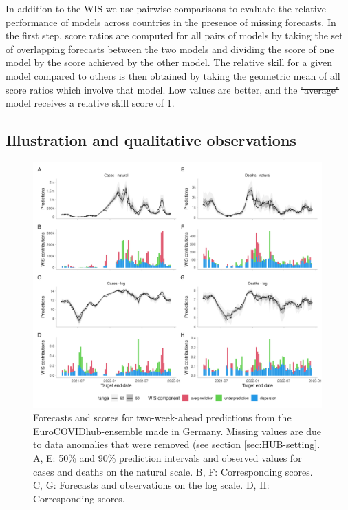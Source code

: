 \documentclass{article}
\providecommand{\DIFaddtex}[1]{{\protect\color{blue}\uwave{#1}}} %
\providecommand{\DIFdeltex}[1]{{\protect\color{red}\sout{#1}}}                      %
\providecommand{\DIFaddbegin}{} %
\providecommand{\DIFaddend}{} %
\providecommand{\DIFdelbegin}{} %
\providecommand{\DIFdelend}{} %
\providecommand{\DIFadd}[1]{\texorpdfstring{\DIFaddtex{#1}}{#1}} %
\providecommand{\DIFdel}[1]{\texorpdfstring{\DIFdeltex{#1}}{}} %
\newcommand{\DIFscaledelfig}{0.5}
\newlength{\DIFdelgraphicswidth} %
\newlength{\DIFdelgraphicsheight} %
\newcommand{\DIFaddincludegraphics}[2][]{{\color{blue}\fbox{\DIFOincludegraphics[#1]{#2}}}} %
\newcommand{\DIFdelincludegraphics}[2][]{%
\sbox{\DIFdelgraphicsbox}{\DIFOincludegraphics[#1]{#2}}%
\settoboxwidth{\DIFdelgraphicswidth}{\DIFdelgraphicsbox} %
\settoboxtotalheight{\DIFdelgraphicsheight}{\DIFdelgraphicsbox} %
\scalebox{\DIFscaledelfig}{%
\parbox[b]{\DIFdelgraphicswidth}{\usebox{\DIFdelgraphicsbox}\\[-\baselineskip] \rule{\DIFdelgraphicswidth}{0em}}\llap{\resizebox{\DIFdelgraphicswidth}{\DIFdelgraphicsheight}{%
\setlength{\unitlength}{\DIFdelgraphicswidth}%
\begin{picture}(1,1)%
\thicklines\linethickness{2pt} %
{\color[rgb]{1,0,0}\put(0,0){\framebox(1,1){}}}%
{\color[rgb]{1,0,0}\put(0,0){\line( 1,1){1}}}%
{\color[rgb]{1,0,0}\put(0,1){\line(1,-1){1}}}%
\end{picture}%
}\hspace*{3pt}}} %
} %
\DeclareRobustCommand{\DIFaddbegin}{\DIFOaddbegin \let\includegraphics\DIFaddincludegraphics} %
\DeclareRobustCommand{\DIFaddend}{\DIFOaddend \let\includegraphics\DIFOincludegraphics} %
\DeclareRobustCommand{\DIFdelbegin}{\DIFOdelbegin \let\includegraphics\DIFdelincludegraphics} %
\DeclareRobustCommand{\DIFdelend}{\DIFOaddend \let\includegraphics\DIFOincludegraphics} %
\begin{document}
In addition to the WIS we use pairwise comparisons \citep{cramerEvaluationIndividualEnsemble2021} to evaluate the relative performance of models across countries in the presence of missing forecasts. In the first step, score ratios are computed for all pairs of models by taking the set of overlapping forecasts between the two models and dividing the score of one model by the score achieved by the other model. The relative skill for a given model compared to others is then obtained by taking the geometric mean of all score ratios which involve that model. Low values are better, and the \DIFdelbegin \DIFdel{"average" }\DIFdelend \DIFaddbegin \DIFadd{``average'' }\DIFaddend model receives a relative skill score of 1. 


\subsection{Illustration and qualitative observations}

\begin{figure}[h!]
    \centering
    \includegraphics[width=0.99\textwidth]{output/figures/HUB-model-comparison-ensemble.png}
    \caption{
    Forecasts and scores for two-week-ahead predictions from the EuroCOVIDhub-ensemble made in Germany. Missing values are due to data anomalies that were removed (see section \ref{sec:HUB-setting}. 
    A, E: 50\% and 90\% prediction intervals and observed values for cases and deaths on the natural scale. B, F: Corresponding scores. C, G: Forecasts and observations on the log scale. D, H: Corresponding scores. 
    }
    \label{fig:HUB-model-comparison-ensemble}
\end{figure}
\end{document}
